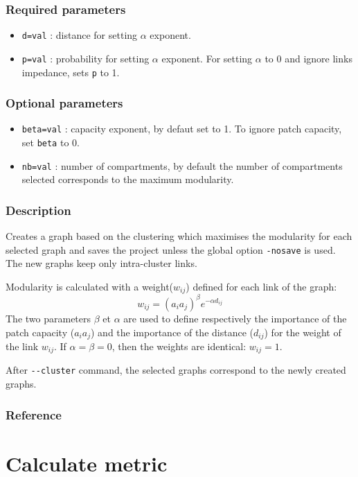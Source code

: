 \documentclass[a4paper,10pt]{report}
\begin{document}
\subsubsection{Required parameters}
\begin{itemize}
	\item \verb|d=val| : distance for setting $\alpha$ exponent.
	\item \verb|p=val| : probability for setting $\alpha$ exponent. For setting $\alpha$ to 0 and ignore links impedance, sets \verb|p| to 1.
\end{itemize}

\subsubsection{Optional parameters}
\begin{itemize}
	\item \verb|beta=val| : capacity exponent, by defaut set to 1. To ignore patch capacity, set \verb|beta| to 0.
	\item \verb|nb=val| : number of compartments, by default the number of compartments selected corresponds to the maximum modularity.
\end{itemize}

\subsubsection{Description}
Creates a graph based on the clustering which maximises the modularity \cite{Newman2006} for each selected graph and saves the project unless the global option \verb|-nosave| is used.
The new graphs keep only intra-cluster links.

Modularity is calculated with a weight($w_{ij}$) defined for each link of the graph:
$$w_{ij} = (a_i a_j)^\beta e^{-\alpha d_{ij}}$$
The two parameters $\beta$ et $\alpha$ are used to define respectively the importance of the patch capacity ($a_i a_j$) and the importance of the distance ($d_{ij}$) for the weight of the link $w_{ij}$. If $\alpha = \beta = 0$, then the weights are identical: $w_{ij} = 1$.  

After \verb|--cluster| command, the selected graphs correspond to the newly created graphs.

\subsubsection{Reference}
\cite{2017_clustering}


\section{Calculate metric}
\end{document}
